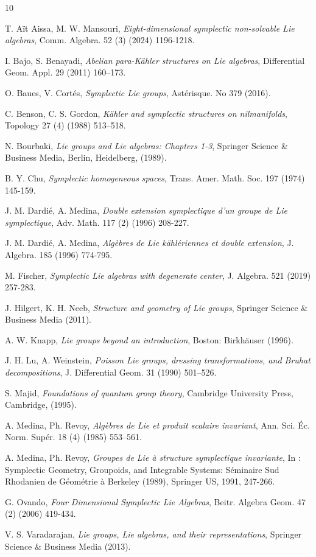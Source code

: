 \documentclass[final,1p,times,nopreprintline]{elsarticle}
\theoremstyle{definition}
\numberwithin{equation}{section}
\numberwithin{equation}{section}
\begin{document}

\begin{thebibliography}{10}
	
  
    T. Aït Aissa, M. W. Mansouri, {\textit{Eight-dimensional symplectic non-solvable Lie algebras}}, Comm. Algebra. 52 (3) (2024) 1196-1218.
	
	 I. Bajo, S. Benayadi, {\textit{Abelian para-Kähler structures on Lie algebras}}, Differential Geom. Appl. 29 (2011) 160–173.
	
	 O. Baues, V. Cortés, {\textit{Symplectic Lie groups}}, Astérisque. No 379 (2016).
	

     C. Benson, C. S. Gordon, {\textit{Kähler and symplectic structures on nilmanifolds}}, Topology 27 (4) (1988) 513–518.

	 N. Bourbaki, {\textit{Lie groups and Lie algebras: Chapters 1-3}},  Springer Science \& Business Media, Berlin, Heidelberg, (1989).
	
	 B. Y. Chu, {\textit{Symplectic homogeneous spaces}}, Trans. Amer. Math. Soc.  197 (1974) 145-159.		
	
	  J. M. Dardié, A. Medina,  {\textit{Double extension symplectique d'un groupe de Lie symplectique}},  Adv. Math. 117 (2) (1996) 208-227.
	
	  J. M. Dardié, A. Medina, {\textit{Algèbres de Lie kählériennes et double extension}}, J. Algebra. 185 (1996) 774-795.
	
	 M. Fischer, {\textit{Symplectic Lie algebras with degenerate center}},  J. Algebra.   521 (2019) 257-283.
	
	 J. Hilgert, K. H. Neeb, {\textit{Structure and geometry of Lie groups}},  Springer Science \& Business Media (2011).
	
	 A. W. Knapp, {\textit{Lie groups beyond an introduction}}, Boston: Birkhäuser (1996).
	
	  J. H. Lu, A. Weinstein, {\textit{Poisson Lie groups, dressing transformations, and Bruhat decompositions}}, J. Differential Geom. 31 (1990) 501–526.
	
	  S. Majid, {\textit{Foundations of quantum group theory}}, Cambridge University Press, Cambridge, (1995).
	
		A. Medina, Ph. Revoy, {\textit{Algèbres de Lie et produit scalaire invariant}}, Ann. Sci. Éc. Norm. Supér. 18 (4) (1985) 553–561.
	
	 A. Medina, Ph. Revoy,  {\textit{Groupes de Lie à structure symplectique invariante}}, In : Symplectic Geometry, Groupoids, and Integrable Systems: Séminaire Sud Rhodanien de Géométrie à Berkeley (1989), Springer US, 1991, 247-266.
	
	 G. Ovando, {\textit{Four Dimensional Symplectic Lie Algebras}}, Beitr. Algebra Geom. 47 (2) (2006)  419-434.
	

	 V. S. Varadarajan,  {\textit{Lie groups, Lie algebras, and their representations}}, Springer Science \& Business Media (2013).
	
\end{thebibliography}
\end{document}
